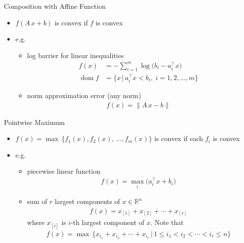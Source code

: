\documentclass[10pt]{beamer}
\newcommand{\ds}{\displaystyle}
\DeclareMathOperator*{\dom}{dom}
\theoremstyle{definition}
\begin{document}
\begin{frame}{Composition with Affine Function}

\begin{itemize}
  \item $\ds f(A\,x + b)$ is convex if $f$ is convex
  \item e.g.
    \begin{itemize}
      \item log barrier for linear inequalities
        \begin{align*}
          f(x) &= - \sum_{i = 1}^m \log\big(b_i - a_i^\top x\big) \\
          \dom f &= \{x\,|\,a_i^\top x < b_i,\;i=1,2,\ldots,m\}
        \end{align*}
      \item norm approximation error (any norm)
        \begin{align*}
          f(x) = \|A\,x - b\|
        \end{align*}
    \end{itemize}
\end{itemize}

\end{frame}

\begin{frame}{Pointwise Maximum}

\begin{itemize}
  \item $\ds f(x) = \max\,\{f_1(x),f_2(x),\,\ldots,f_m(x)\}$ is convex if each $f_i$ is convex
  \item e.g.
    \begin{itemize}
      \item piecewise linear function
        \begin{align*}
          f(x) = \max_i\big(a_i^\top x + b_i\big)
        \end{align*}
      \item sum of $r$ largest components of $x\in\mathbb{R}^n$  
        \begin{align*}
          f(x) = x_{[1]} + x_{[2]} + \cdots + x_{[r]}
        \end{align*}
        where $x_{[i]}$ is $i$-th largest component of $x$. Note that
        \begin{align*}
          f(x) = \max\,\{x_{i_1} + x_{i_2} + \cdots + x_{i_r}\,|\,1\leqslant i_1 < i_2 < \cdots < i_r\leqslant n\}
        \end{align*}
    \end{itemize}
\end{itemize}

\end{frame}
\end{document}
